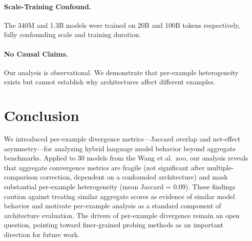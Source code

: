 \documentclass[11pt,a4paper]{article}
\begin{document}
\paragraph{Scale-Training Confound.}
The 340M and 1.3B models were trained on 20B and 100B tokens respectively, fully confounding scale and training duration.

\paragraph{No Causal Claims.}
Our analysis is observational.
We demonstrate that per-example heterogeneity exists but cannot establish why architectures affect different examples.

\section{Conclusion}
\label{sec:conclusion}

We introduced per-example divergence metrics---Jaccard overlap and net-effect asymmetry---for analyzing hybrid language model behavior beyond aggregate benchmarks.
Applied to 30 models from the Wang et al.\ zoo, our analysis reveals that aggregate convergence metrics are fragile (not significant after multiple-comparison correction, dependent on a confounded architecture) and mask substantial per-example heterogeneity (mean Jaccard = 0.09).
These findings caution against treating similar aggregate scores as evidence of similar model behavior and motivate per-example analysis as a standard component of architecture evaluation.
The drivers of per-example divergence remain an open question, pointing toward finer-grained probing methods as an important direction for future work.
\end{document}
